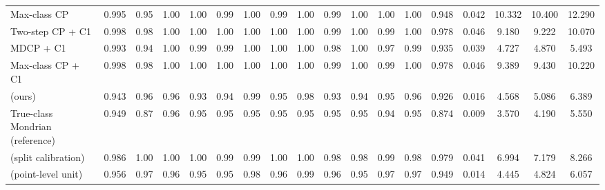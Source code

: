 \begin{table}[!htbp]
{\begin{tabular}{lccccccccccccccccc}
Max-class CP & 0.995 & 0.95 & 1.00 & 1.00 & 0.99 & 1.00 & 0.99 & 1.00 & 0.99 & 1.00 & 1.00 & 1.00 & 0.948 & 0.042 & 10.332 & 10.400 & 12.290 \\
Two-step CP + C1 & 0.998 & 0.98 & 1.00 & 1.00 & 1.00 & 1.00 & 1.00 & 1.00 & 0.99 & 1.00 & 0.99 & 1.00 & 0.978 & 0.046 & 9.180 & 9.222 & 10.070 \\
MDCP + C1 & 0.993 & 0.94 & 1.00 & 0.99 & 0.99 & 1.00 & 1.00 & 1.00 & 0.98 & 1.00 & 0.97 & 0.99 & 0.935 & 0.039 & 4.727 & 4.870 & 5.493 \\
Max-class CP + C1 & 0.998 & 0.98 & 1.00 & 1.00 & 1.00 & 1.00 & 1.00 & 1.00 & 0.99 & 1.00 & 0.99 & 1.00 & 0.978 & 0.046 & 9.389 & 9.430 & 10.220 \\
\gamut{} (ours) & 0.943 & 0.96 & 0.96 & 0.93 & 0.94 & 0.99 & 0.95 & 0.98 & 0.93 & 0.94 & 0.95 & 0.96 & 0.926 & 0.016 & 4.568 & 5.086 & 6.389 \\
True-class Mondrian (reference) & 0.949 & 0.87 & 0.96 & 0.95 & 0.95 & 0.95 & 0.95 & 0.95 & 0.95 & 0.95 & 0.94 & 0.95 & 0.874 & 0.009 & 3.570 & 4.190 & 5.550 \\
\gamut{} (split calibration) & 0.986 & 1.00 & 1.00 & 1.00 & 0.99 & 0.99 & 1.00 & 1.00 & 0.98 & 0.98 & 0.99 & 0.98 & 0.979 & 0.041 & 6.994 & 7.179 & 8.266 \\
\gamut{} (point-level unit) & 0.956 & 0.97 & 0.96 & 0.95 & 0.95 & 0.98 & 0.96 & 0.99 & 0.96 & 0.95 & 0.97 & 0.97 & 0.949 & 0.014 & 4.445 & 4.824 & 6.057 \\
\bottomrule
\end{tabular}}
\end{table}
\FloatBarrier
